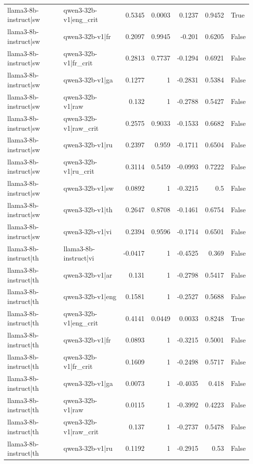 \begin{table}
\begin{tabular}{l l r r r r l}
llama3-8b-instruct|sw & qwen3-32b-v1|eng_crit & 0.5345 & 0.0003 & 0.1237 & 0.9452 & True \\
llama3-8b-instruct|sw & qwen3-32b-v1|fr & 0.2097 & 0.9945 & -0.201 & 0.6205 & False \\
llama3-8b-instruct|sw & qwen3-32b-v1|fr_crit & 0.2813 & 0.7737 & -0.1294 & 0.6921 & False \\
llama3-8b-instruct|sw & qwen3-32b-v1|ga & 0.1277 & 1 & -0.2831 & 0.5384 & False \\
llama3-8b-instruct|sw & qwen3-32b-v1|raw & 0.132 & 1 & -0.2788 & 0.5427 & False \\
llama3-8b-instruct|sw & qwen3-32b-v1|raw_crit & 0.2575 & 0.9033 & -0.1533 & 0.6682 & False \\
llama3-8b-instruct|sw & qwen3-32b-v1|ru & 0.2397 & 0.959 & -0.1711 & 0.6504 & False \\
llama3-8b-instruct|sw & qwen3-32b-v1|ru_crit & 0.3114 & 0.5459 & -0.0993 & 0.7222 & False \\
llama3-8b-instruct|sw & qwen3-32b-v1|sw & 0.0892 & 1 & -0.3215 & 0.5 & False \\
llama3-8b-instruct|sw & qwen3-32b-v1|th & 0.2647 & 0.8708 & -0.1461 & 0.6754 & False \\
llama3-8b-instruct|sw & qwen3-32b-v1|vi & 0.2394 & 0.9596 & -0.1714 & 0.6501 & False \\
llama3-8b-instruct|th & llama3-8b-instruct|vi & -0.0417 & 1 & -0.4525 & 0.369 & False \\
llama3-8b-instruct|th & qwen3-32b-v1|ar & 0.131 & 1 & -0.2798 & 0.5417 & False \\
llama3-8b-instruct|th & qwen3-32b-v1|eng & 0.1581 & 1 & -0.2527 & 0.5688 & False \\
llama3-8b-instruct|th & qwen3-32b-v1|eng_crit & 0.4141 & 0.0449 & 0.0033 & 0.8248 & True \\
llama3-8b-instruct|th & qwen3-32b-v1|fr & 0.0893 & 1 & -0.3215 & 0.5001 & False \\
llama3-8b-instruct|th & qwen3-32b-v1|fr_crit & 0.1609 & 1 & -0.2498 & 0.5717 & False \\
llama3-8b-instruct|th & qwen3-32b-v1|ga & 0.0073 & 1 & -0.4035 & 0.418 & False \\
llama3-8b-instruct|th & qwen3-32b-v1|raw & 0.0115 & 1 & -0.3992 & 0.4223 & False \\
llama3-8b-instruct|th & qwen3-32b-v1|raw_crit & 0.137 & 1 & -0.2737 & 0.5478 & False \\
llama3-8b-instruct|th & qwen3-32b-v1|ru & 0.1192 & 1 & -0.2915 & 0.53 & False \\

\end{tabular}
\end{table}
